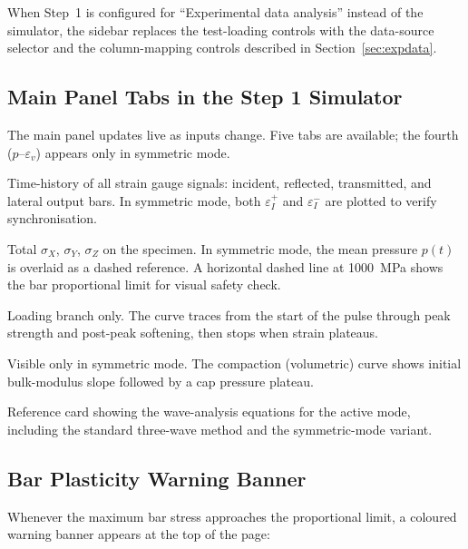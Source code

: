 \documentclass[11pt,a4paper]{article}
\providecommand{\SI}[2]{\qty{#1}{#2}}
\newcommand{\sig}{\sigma}
\newcommand{\eps}{\varepsilon}
\begin{document}
When Step~1 is configured for ``Experimental data analysis'' instead of the
simulator, the sidebar replaces the test-loading controls with the data-source
selector and the column-mapping controls described in
Section~\ref{sec:expdata}.

\subsection{Main Panel Tabs in the Step 1 Simulator}

The main panel updates live as inputs change. Five tabs are available; the
fourth ($p$--$\eps_v$) appears only in symmetric mode.

\begin{description}[leftmargin=2em, style=nextline]
  \item[Bar Waveforms] Time-history of all strain gauge signals: incident,
    reflected, transmitted, and lateral output bars. In symmetric mode, both
    $\eps_I^+$ and $\eps_I^-$ are plotted to verify synchronisation.

  \item[Specimen Stresses] Total $\sig_X$, $\sig_Y$, $\sig_Z$ on the specimen.
    In symmetric mode, the mean pressure $p(t)$ is overlaid as a dashed
    reference. A horizontal dashed line at \SI{1000}{MPa} shows the bar
    proportional limit for visual safety check.

  \item[$\sig$--$\eps$ Curve] Loading branch only. The curve traces from the
    start of the pulse through peak strength and post-peak softening, then
    stops when strain plateaus.

  \item[$p$--$\eps_v$] Visible only in symmetric mode. The compaction
    (volumetric) curve shows initial bulk-modulus slope followed by a cap
    pressure plateau.

  \item[Equations] Reference card showing the wave-analysis equations for
    the active mode, including the standard three-wave method and the
    symmetric-mode variant.
\end{description}

\subsection{Bar Plasticity Warning Banner}

Whenever the maximum bar stress approaches the proportional limit, a coloured
warning banner appears at the top of the page:
\end{document}
